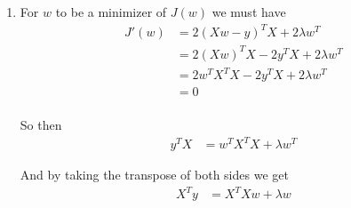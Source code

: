 \documentclass[12pt,letterpaper]{article}
\begin{document}
\begin{solution}{}
$\,$
\newline
\begin{enumerate}
    \item For $w$ to be a minimizer of $J(w)$ we must have 
    \begin{align*}
        J'(w) &= 2(Xw-y)^TX + 2\lambda w^T\\
        &= 2(Xw)^TX - 2y^TX + 2\lambda w^T\\
        &= 2w^TX^TX - 2y^TX + 2\lambda w^T\\
        &= 0\\
    \end{align*}
    
So then 
\begin{align*}
    y^TX &= w^TX^TX + \lambda w^T
\end{align*}

And by taking the transpose of both sides we get 
\begin{align*}
    X^Ty &= X^TXw + \lambda w
\end{align*}
\end{enumerate}



\end{solution}
\end{document}
